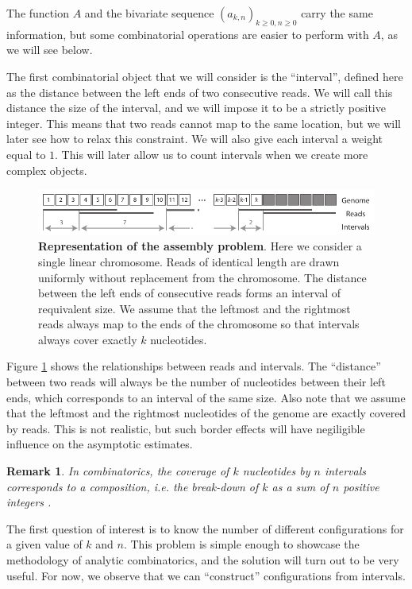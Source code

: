 \documentclass{article}
\newtheorem{remark}{Remark}
\begin{document}
The function $A$ and the bivariate sequence $(a_{k,n})_{k \geq 0, n \geq
0}$ carry the same information, but some combinatorial operations are
easier to perform with $A$, as we will see below.

The first combinatorial object that we will consider is the ``interval'',
defined here as the distance between the left ends of two consecutive
reads. We will call this distance the size of the interval, and we will
impose it to be a strictly positive integer. This means that two reads
cannot map to the same location, but we will later see how to relax this
constraint. We will also give each interval a weight equal to $1$. This
will later allow us to count intervals when we create more complex
objects.

\begin{figure}[h]
\centering
\includegraphics[scale=0.89]{Fig1.pdf}
\caption{\textbf{Representation of the assembly problem}. Here we consider
a single linear chromosome. Reads of identical length are drawn uniformly
without replacement from the chromosome. The distance between the left
ends of consecutive reads forms an interval of requivalent size. We assume
that the leftmost and the rightmost reads always map to the ends of the
chromosome so that intervals always cover exactly $k$ nucleotides.}
\label{fig:sketchass}
\end{figure}

Figure \ref{fig:sketchass} shows the relationships between reads and
intervals. The ``distance'' between two reads will always be the number of
nucleotides between their left ends, which corresponds to an interval of
the same size. Also note that we assume that the leftmost and the
rightmost nucleotides of the genome are exactly covered by reads. This is
not realistic, but such border effects will have negiligible influence on
the asymptotic estimates.

\begin{remark}
In combinatorics, the coverage of $k$ nucleotides by $n$ intervals
corresponds to a \emph{composition}, \textit{i.e.} the break-down of $k$
as a sum of $n$ positive integers \cite{AnalComb2009}.
\end{remark}

The first question of interest is to know the number of different
configurations for a given value of $k$ and $n$. This problem is simple
enough to showcase the methodology of analytic combinatorics, and the
solution will turn out to be very useful. For now, we observe that we can
``construct'' configurations from intervals.
\end{document}
